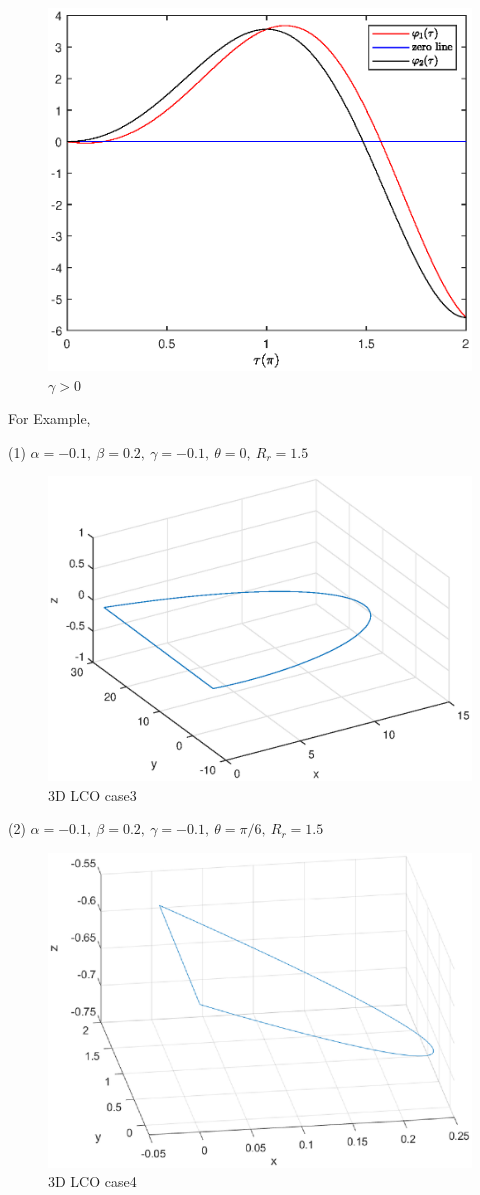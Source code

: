 \documentclass[a4paper,10pt]{article}
\begin{document}
\begin{enumerate}
		\begin{figure}[h]
			\centering
			\includegraphics[width= 0.6 \textwidth]{BEB_Explanation/figures/gamma_positive.eps}
			\caption{$\gamma > 0$}
			\label{fig:auxilliary function positive gamma}
		\end{figure}
	\end{enumerate}
	
 	For Example, 
	
	(1) $\alpha = -0.1,~\beta =0.2,~ \gamma = -0.1,~\theta = 0,~R_r=1.5$
	\begin{figure}[h]
		\centering
		\includegraphics[width= 0.6 \textwidth]{BEB_Explanation/figures/case3_LCO.eps}
		\caption{3D LCO case3}
		\label{fig:3D LCO case3}
	\end{figure}
	
	(2) $\alpha = -0.1,~\beta =0.2,~ \gamma = -0.1,~\theta = \pi/6,~R_r=1.5$
	\begin{figure}[h]
		\centering
		\includegraphics[width= 0.6 \textwidth]{BEB_Explanation/figures/case4_LCO.eps}
		\caption{3D LCO case4}
		\label{fig:3D LCO case4}
	\end{figure}
\end{document}
